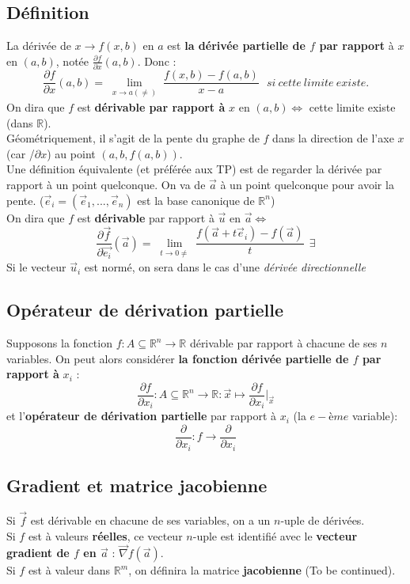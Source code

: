 \documentclass	[11pt, a4paper, openany]{book}
\begin{document}
\subsection{Définition}
La dérivée de $x \rightarrow f(x, b)$ en $a$ est \textbf{la dérivée partielle de $f$ par rapport} à $x$ en $(a,b)$, notée $\frac{\partial f}{\partial x}(a,b)$. Donc :
$$\frac{\partial f}{\partial x}(a,b) = \lim\limits_{\substack{x \to a(\neq)}} \frac{f(x,b) - f(a,b)}{x-a}\ \ \ si\ cette\ limite\ existe.$$
On dira que $f$ est \textbf{dérivable par rapport à} $x$ en $(a,b) \Leftrightarrow$ cette limite existe (dans $\mathbb{R}$).\\
Géométriquement, il s'agit de la pente du graphe de $f$ dans la direction de l'axe $x$ (car /$\partial x$) au point $(a, b, f(a,b))$.\\

Une définition équivalente (et préférée aux TP) est  de regarder la dérivée par rapport à un point quelconque. On va de $\vec{a}$ à un point quelconque pour avoir la pente. ($\vec{e}_i = (\vec{e}_1, ..., \vec{e}_n)$ est la base canonique de $\mathbb{R}^n$)\\

On dira que $f$ est \textbf{dérivable} par rapport à $\vec{u}$ en $\vec{a} \Leftrightarrow$
$$\frac{\partial\vec{f}}{\partial \vec{e_i}}(\vec{a}) = \lim\limits_{\substack{t \to 0 \neq}} \frac{f(\vec{a} + t\vec{e}_i) - f(\vec{a})}{t}\ \ \exists$$
Si le vecteur $\vec{u}_i$ est normé, on sera dans le cas d'une \textit{dérivée directionnelle}\\



\subsection{Opérateur de dérivation partielle}
Supposons la fonction $f : A \subseteq \mathbb{R}^n \rightarrow \mathbb{R}$ dérivable par rapport à chacune de ses $n$ variables. On peut alors considérer \textbf{la fonction dérivée partielle de $f$ par rapport à} $x_i$ :
$$\frac{\partial f}{\partial x_i} : A \subseteq \mathbb{R}^n \rightarrow \mathbb{R} : \vec{x} \mapsto \frac{\partial f}{\partial x_i}|_{\vec{x}}$$
et l'\textbf{opérateur de dérivation partielle} par rapport à $x_i$ (la $e-{ème}$ variable):
$$\frac{\partial}{\partial x_i} : f \rightarrow \frac{\partial}{\partial x_i}$$

\subsection{Gradient et matrice jacobienne}
Si $\vec{f}$ est dérivable en chacune de ses variables, on a un $n$-uple de dérivées. \\
Si $f$ est à valeurs \textbf{réelles}, ce vecteur $n$-uple est identifié avec le \textbf{vecteur gradient de $f$ en $\vec{a}$} : $\vec{\nabla}f(\vec{a})$.\\
Si $f$ est à valeur dans $\mathbb{R}^m$, on définira la matrice \textbf{jacobienne} (To be continued).
\end{document}
